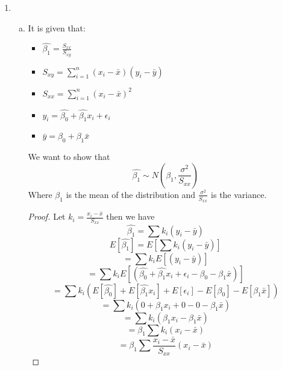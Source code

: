 \documentclass[12pt]{article}
\begin{document}
\begin{enumerate}[1.]
\begin{enumerate}[(a)]
\begin{proof}
                proof continued.
                \begin{align*}
                    \sum_{i=1}^{n} \hat{y_i}e_i &= (n\bar{y}^2 - (n\bar{y}^2 - \hat{\beta_1}^2n\bar{x}^2 + \hat{\beta_1}^2n\bar{x}^2)) \\
                    &= (n\bar{y}^2 - n\bar{y}^2) \\
                    &= 0
                \end{align*}
                \[LHS = 0 = RHS\]   
            \end{proof}
            $\therefore$ It is true that the predicted values $\hat{y_i}$ is completely orthogonal to the residuals $e_i$.
    \end{enumerate}
    \item 
        \begin{enumerate}[(a)]
            \item It is given that:
            \begin{itemize}
                \item $\hat{\beta_1} = \frac{S_{xx}}{S_{xy}}$
                \item $S_{xy} = \sum_{i = 1}^{n} (x_i - \bar{x})(y_i - \bar{y})$
                \item $S_{xx} = \sum_{i = 1}^{n} (x_i - \bar{x})^2$
                \item $y_i = \hat{\beta_0} + \hat{\beta_1} x_i + \epsilon_i$
                \item $\bar{y} = \beta_0 + \beta_1 \bar{x}$
            \end{itemize}
            We want to show that 
            \[\hat{\beta_1} \sim N(\beta_1, \frac{\sigma^2}{S_{xx}})\]
            Where $\beta_1$ is the mean of the distribution and $\frac{\sigma^2}{S_{xx}}$ is the variance.
            \begin{proof}
            Let $k_i = \frac{x_i - \bar{x}}{S_{xx}}$ then we have
            \[ \hat{\beta_1} = \sum k_i (y_i - \bar{y})\]
            \[ E[\hat{\beta_1}] = E\left[ \sum k_i (y_i - \bar{y}) \right] \]
            \[=  \sum k_i E[(y_i - \bar{y})] \]
            \[=  \sum k_i E[(\hat{\beta_0} + \hat{\beta_1} x_i + \epsilon_i - \beta_0 - \beta_1 \bar{x})] \]
            \[=  \sum k_i (E[\hat{\beta_0}] + E[\hat{\beta_1} x_i] + E[\epsilon_i] - E[\beta_0] - E[\beta_1 \bar{x}]) \]
            \[=  \sum k_i (0 + \beta_1 x_i + 0 - 0 - \beta_1 \bar{x}) \]
            \[=  \sum k_i (\beta_1 x_i - \beta_1 \bar{x}) \]
            \[=  \beta_1 \sum k_i (x_i - \bar{x}) \]
            \[=  \beta_1 \sum \frac{x_i - \bar{x}}{S_{xx}} (x_i - \bar{x}) \]

\end{proof}
\end{enumerate}
\end{enumerate}
\end{document}
